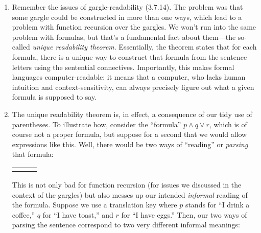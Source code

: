 	\begin{enumerate}[\thesection.1]

		\item Remember the issues of gargle-readability (3.7.14). The problem was that some gargle could be constructed in more than one ways, which lead to a problem with function recursion over the gargles. We won't run into the same problem with formulas, but that's a fundamental fact about them---the so-called \emph{unique readability theorem}. Essentially, the theorem states that for each formula, there is a unique way to construct that formula from the sentence letters using the sentential connectives. Importantly, this makes formal languages computer-readable: it means that a computer, who lacks human intuition and context-sensitivity, can always precisely figure out what a given formula is supposed to say.
		
		\item The unique readability theorem is, in effect, a consequence of our tidy use of parentheses. To illustrate how, consider the ``formula'' $p\land q\lor r$, which is of course not a proper formula, but suppose for a second that we would allow expressions like this. Well, there would be two ways of ``reading'' or \emph{parsing} that formula:
		
		\begin{center}
		
		\begin{tabular}{c c c}
		\begin{tikzpicture}
		{\Tree [.$p\land q\lor r$ [.$p$ ] [.$q\lor r$ [.$q$ ] [.$r$ ] ] ]}
		\end{tikzpicture}

		& 
		
		\qquad \raisebox{7.5ex}{vs.} \qquad 
				\begin{tikzpicture}

		{\Tree [.$p\land q\lor r$ [.$p\land q$ [.$p$ ] [.$q$ ] ] [.$r$ ] ]}
		\end{tikzpicture}

		\end{tabular}
		\end{center}
This is not only bad for function recursion (for issues we discussed in the context of the gargles) but also messes up our intended \emph{informal} reading of the formula. Suppose we use a translation key where $p$ stands for ``I drink a coffee,'' $q$ for ``I have toast,'' and $r$ for ``I have eggs.'' Then, our two ways of parsing the sentence correspond to two very different informal meanings:
	\begin{itemize}
	

\end{itemize}
\end{enumerate}
